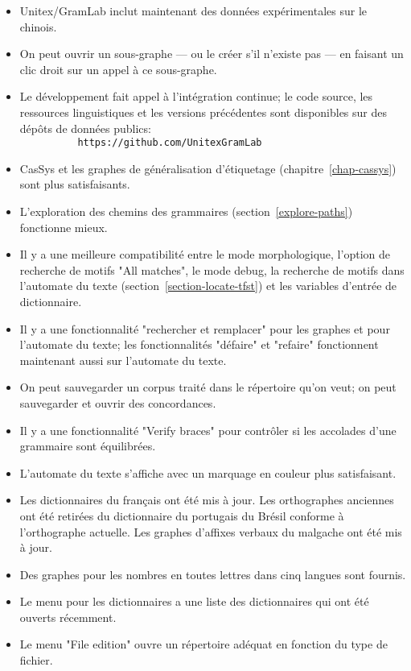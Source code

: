 \begin{itemize}
  \item Unitex/GramLab inclut maintenant des données expérimentales sur le chinois.
  \item On peut ouvrir un sous-graphe --- ou le créer s'il n'existe pas --- en faisant un clic droit sur un
  appel à ce sous-graphe.
  \item Le développement fait appel à l'intégration continue; le code source, les ressources
  linguistiques et les versions précédentes sont disponibles sur des dépôts de données publics:\\
  \verb$          https://github.com/UnitexGramLab$
  \item CasSys et les graphes de généralisation d'étiquetage (chapitre~\ref{chap-cassys}) sont plus
  satisfaisants.
  \item L'exploration des chemins des grammaires (section~\ref{explore-paths}) fonctionne mieux.
  \item Il y a une meilleure compatibilité entre le mode morphologique, l'option de recherche de motifs
  "All matches",   le mode debug, la recherche de motifs dans l'automate du texte
  (section~\ref{section-locate-tfst}) et les variables d'entrée de dictionnaire.
  \item Il y a une fonctionnalité "rechercher et remplacer" pour les graphes et pour l'automate du texte;
  les fonctionnalités "défaire" et "refaire" fonctionnent maintenant aussi sur l'automate du texte.
  \item On peut sauvegarder un corpus traité dans le répertoire qu'on veut; on peut sauvegarder
  et ouvrir des concordances.
  \item Il y a une fonctionnalité "Verify braces" pour contrôler si les accolades d'une grammaire sont
  équilibrées.
  \item L'automate du texte s'affiche avec un marquage en couleur plus satisfaisant.
  \item Les dictionnaires du français ont été mis à jour. Les orthographes anciennes ont été retirées du
  dictionnaire du portugais du Brésil conforme à l'orthographe actuelle. Les graphes d'affixes verbaux
  du malgache ont été mis à jour.
  \item Des graphes pour les nombres en toutes lettres dans cinq langues sont fournis.
  \item Le menu pour les dictionnaires a une liste des dictionnaires qui ont été ouverts récemment.
  \item Le menu "File edition" ouvre un répertoire adéquat en fonction du type de fichier.

\end{itemize}
